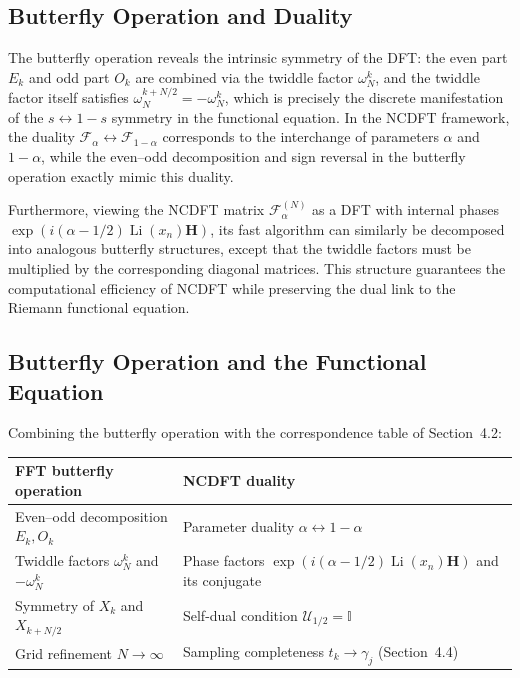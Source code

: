 \documentclass[12pt,a4paper]{amsart}
\theoremstyle{plain}
\theoremstyle{definition}
\theoremstyle{remark}
\begin{document}
\subsection{Butterfly Operation and Duality}

The butterfly operation reveals the intrinsic symmetry of the DFT: the even part $E_k$ and odd part $O_k$ are combined via the twiddle factor $\omega_N^k$, and the twiddle factor itself satisfies $\omega_N^{k+N/2} = -\omega_N^k$, which is precisely the discrete manifestation of the $s \leftrightarrow 1-s$ symmetry in the functional equation. In the NCDFT framework, the duality $\mathcal{F}_\alpha \leftrightarrow \mathcal{F}_{1-\alpha}$ corresponds to the interchange of parameters $\alpha$ and $1-\alpha$, while the even--odd decomposition and sign reversal in the butterfly operation exactly mimic this duality.

Furthermore, viewing the NCDFT matrix $\mathcal{F}_\alpha^{(N)}$ as a DFT with internal phases $\exp(i(\alpha-1/2)\operatorname{Li}(x_n)\mathbf{H})$, its fast algorithm can similarly be decomposed into analogous butterfly structures, except that the twiddle factors must be multiplied by the corresponding diagonal matrices. This structure guarantees the computational efficiency of NCDFT while preserving the dual link to the Riemann functional equation.

\subsection{Butterfly Operation and the Functional Equation}

Combining the butterfly operation with the correspondence table of Section~4.2:

\begin{center}
\begin{tabular}{|l|l|}
\hline
FFT butterfly operation & NCDFT duality \\
\hline
Even--odd decomposition $E_k, O_k$ & Parameter duality $\alpha \leftrightarrow 1-\alpha$ \\
Twiddle factors $\omega_N^k$ and $-\omega_N^k$ & Phase factors $\exp(i(\alpha-1/2)\operatorname{Li}(x_n)\mathbf{H})$ and its conjugate \\
Symmetry of $X_k$ and $X_{k+N/2}$ & Self-dual condition $\mathcal{U}_{1/2}=\mathbb{I}$ \\
Grid refinement $N\to\infty$ & Sampling completeness $t_k \to \gamma_j$ (Section~4.4) \\
\hline
\end{tabular}
\end{center}
\end{document}
